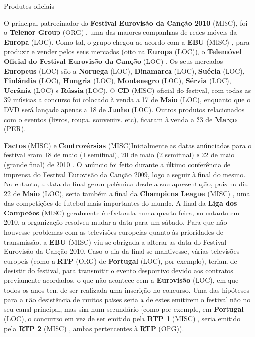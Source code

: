 \documentclass[12pt,a4paper]{article}
\begin{document}
Produtos oficiais

O principal patrocinador do \textbf{Festival Eurovisão da Canção 2010} (MISC), foi o \textbf{Telenor Group} (ORG) , uma das maiores companhias de redes móveis da \textbf{Europa} (LOC). Como tal, o grupo chegou ao acordo com a \textbf{EBU} (MISC) , para produzir e vender pelos seus mercados (oito na \textbf{Europa} (LOC)), o \textbf{Telemóvel Oficial do Festival Eurovisão da Canção} (LOC) . Os seus mercados \textbf{Europeus} (LOC) são a \textbf{Noruega} (LOC), \textbf{Dinamarca} (LOC), \textbf{Suécia} (LOC), \textbf{Finlândia} (LOC), \textbf{Hungria} (LOC), \textbf{Montenegro} (LOC), \textbf{Sérvia} (LOC), \textbf{Ucrânia} (LOC) e \textbf{Rússia} (LOC). O \textbf{CD} (MISC) oficial do festival, com todas as 39 músicas a concurso foi colocado à venda a 17 de \textbf{Maio} (LOC), enquanto que o DVD será lançado apenas a 18 de \textbf{Junho} (LOC). Outros produtos relacionados com o eventos (livros, roupa, souvenirs, etc), ficaram à venda a 23 de \textbf{Março} (PER).



\textbf{Factos} (MISC) e \textbf{Controvérsias} (MISC)Inicialmente as datas anúnciadas para o festival eram 18 de maio (1 semifinal), 20 de maio (2 semifinal) e 22 de maio (grande final) de 2010 . O anúncio foi feito durante a último conferência de imprensa do Festival Eurovisão da Canção 2009, logo a seguir à final do mesmo. No entanto, a data da final gerou polémica desde a sua apresentação, pois no dia 22 de \textbf{Maio} (LOC), seria também a final da \textbf{Champions League} (MISC) , uma das competições de futebol mais importantes do mundo. A final da \textbf{Liga dos Campeões} (MISC) geralmente é efectuada numa quarta-feira, no entanto em 2010, a organização resolveu mudar a data para um sábado. Para que não houvesse problemas com as televisões europeias quanto às prioridades de transmissão, a \textbf{EBU} (MISC) viu-se obrigada a alterar as data do Festival Eurovisão da Canção 2010. Caso o dia da final se mantivesse, várias televisões europeis (como a \textbf{RTP} (ORG) de \textbf{Portugal} (LOC), por exemplo), teriam de desistir do festival, para transmitir o evento desportivo devido aos contratos previamente acordados, o que não acontece com a \textbf{Eurovisão} (LOC), em que todos os anos tem de ser realizada uma inscrição no concurso. Uma das hipóteses para a não desistência de muitos países seria a de estes emitirem o festival não no seu canal principal, mas sim num secundário (como por exemplo, em \textbf{Portugal} (LOC), o concurrso em vez de ser emitido pela \textbf{RTP 1} (MISC) , seria emitido pela \textbf{RTP 2} (MISC) , ambas pertencentes à \textbf{RTP} (ORG)).
\end{document}
